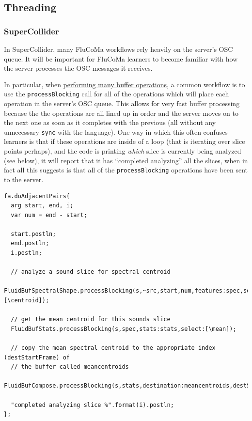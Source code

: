 \documentclass{article}
\begin{document}
\subsection{Threading}\label{threading}

\subsubsection{SuperCollider}\label{sc}

In SuperCollider, many FluCoMa workflows rely heavily on the server's
OSC queue. It will be important for FluCoMa learners to become familiar
with how the server processes the OSC messages it receives.

In particular, when
\href{https://www.youtube.com/watch?v=sabA8p8Y-Xs&list=PLLzzOXU4pTgIZREPJy3Y6oivWI9x-nVge&index=2}{performing
many buffer operations}, a common workflow is to use the
\texttt{processBlocking} call for all of the operations which will place
each operation in the server's OSC queue. This allows for very fast
buffer processing because the the operations are all lined up in order
and the server moves on to the next one as soon as it completes with the
previous (all without any unnecessary \texttt{sync} with the language).
One way in which this often confuses learners is that if these
operations are inside of a loop (that is iterating over slice points
perhaps), and the code is printing \emph{which} slice is currently being
analyzed (see below), it will report that it has ``completed analyzing''
all the slices, when in fact all this suggests is that all of the
\texttt{processBlocking} operations have been sent to the server.

\begin{verbatim}
fa.doAdjacentPairs{
  arg start, end, i;
  var num = end - start;
  
  start.postln;
  end.postln;
  i.postln;

  // analyze a sound slice for spectral centroid
  FluidBufSpectralShape.processBlocking(s,~src,start,num,features:spec,select:[\centroid]);

  // get the mean centroid for this sounds slice
  FluidBufStats.processBlocking(s,spec,stats:stats,select:[\mean]);

  // copy the mean spectral centroid to the appropriate index (destStartFrame) of
  // the buffer called meancentroids
  FluidBufCompose.processBlocking(s,stats,destination:meancentroids,destStartFrame:i);

  "completed analyzing slice %".format(i).postln;
};
\end{verbatim}
\end{document}

